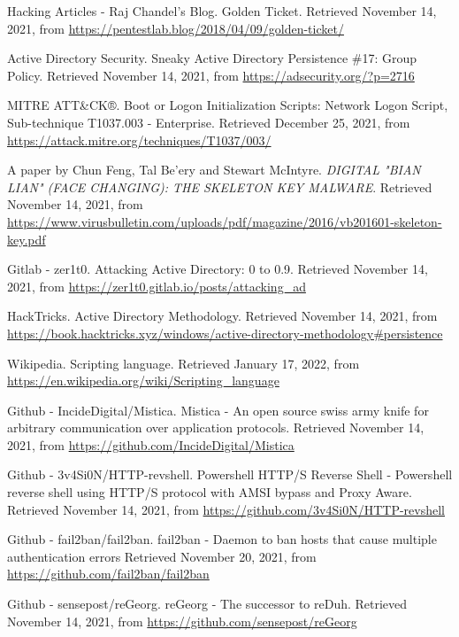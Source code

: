\begin{thebibliography}{99}
Hacking Articles - Raj Chandel's Blog.
Golden Ticket.
Retrieved November 14, 2021, from \url{https://pentestlab.blog/2018/04/09/golden-ticket/}

Active Directory Security.
Sneaky Active Directory Persistence \#17: Group Policy.
Retrieved November 14, 2021, from \url{https://adsecurity.org/?p=2716}

MITRE ATT\&CK®.
Boot or Logon Initialization Scripts: Network Logon Script, Sub-technique T1037.003 - Enterprise.	
Retrieved December 25, 2021, from \url{https://attack.mitre.org/techniques/T1037/003/}

A paper by Chun Feng, Tal Be’ery and Stewart McIntyre.
\emph{DIGITAL "BIAN LIAN" (FACE CHANGING): THE SKELETON KEY MALWARE}.
Retrieved November 14, 2021, from \url{https://www.virusbulletin.com/uploads/pdf/magazine/2016/vb201601-skeleton-key.pdf}

Gitlab - zer1t0.
Attacking Active Directory: 0 to 0.9.
Retrieved November 14, 2021, from \url{https://zer1t0.gitlab.io/posts/attacking_ad}

HackTricks.
Active Directory Methodology. 
Retrieved November 14, 2021, from \url{https://book.hacktricks.xyz/windows/active-directory-methodology#persistence}

Wikipedia.
Scripting language.	
Retrieved January 17, 2022, from \url{https://en.wikipedia.org/wiki/Scripting_language}


Github - IncideDigital/Mistica.
Mistica - An open source swiss army knife for arbitrary communication over application protocols.
Retrieved November 14, 2021, from \url{https://github.com/IncideDigital/Mistica}

Github - 3v4Si0N/HTTP-revshell.
Powershell HTTP/S Reverse Shell - Powershell reverse shell using HTTP/S protocol with AMSI bypass and Proxy Aware.
Retrieved November 14, 2021, from \url{https://github.com/3v4Si0N/HTTP-revshell}


Github - fail2ban/fail2ban.
fail2ban - Daemon to ban hosts that cause multiple authentication errors 
Retrieved November 20, 2021, from \url{https://github.com/fail2ban/fail2ban}


Github - sensepost/reGeorg.
reGeorg - The successor to reDuh.
Retrieved November 14, 2021, from \url{https://github.com/sensepost/reGeorg}



\end{thebibliography}
